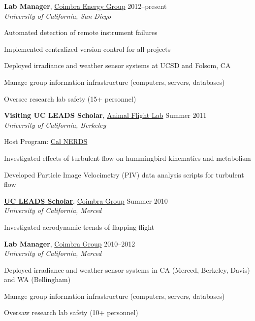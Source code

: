 \documentclass[10pt]{article}
\newcommand{\blankline}{\quad\pagebreak[3]}
\begin{document}
\blankline

\textbf{Lab Manager}, \href{http://coimbra.ucsd.edu/}{Coimbra Energy Group} \hfill 2012--present \\
\textit{University of California, San Diego}
\begin{innerlist}
    \item Automated detection of remote instrument failures
    \item Implemented centralized version control for all projects
    \item Deployed irradiance and weather sensor systems at UCSD and Folsom, CA
    \item Manage group information infrastructure (computers, servers, databases)
    \item Oversee research lab safety (15+ personnel)
\end{innerlist}


\blankline


\textbf{Visiting UC LEADS Scholar}, \href{http://ib.berkeley.edu/labs/dudley}{Animal Flight Lab} \hfill Summer 2011 \\
\textit{University of California, Berkeley}
\begin{innerlist}
    \item Host Program: \href{http://ucberkeleynerds.com/}{Cal NERDS}
    \item Investigated effects of turbulent flow on hummingbird kinematics and metabolism
    \item Developed Particle Image Velocimetry (PIV) data analysis scripts for turbulent flow
\end{innerlist}


\blankline


\textbf{\href{http://graduatedivision.ucmerced.edu/grad-prep-programs/uc-leads}{UC LEADS Scholar}}, \href{http://coimbra.ucsd.edu/}{Coimbra Group} \hfill Summer 2010 \\
\textit{University of California, Merced}
\begin{innerlist}
    \item Investigated aerodynamic trends of flapping flight
\end{innerlist}


\blankline


\textbf{Lab Manager}, \href{http://coimbra.ucsd.edu/}{Coimbra Group} \hfill 2010--2012 \\
\textit{University of California, Merced}
\begin{innerlist}
    \item Deployed irradiance and weather sensor systems in CA (Merced, Berkeley, Davis) and WA (Bellingham)
    \item Manage group information infrastructure (computers, servers, databases)
    \item Oversaw research lab safety (10+ personnel)
\end{innerlist}
\end{document}
